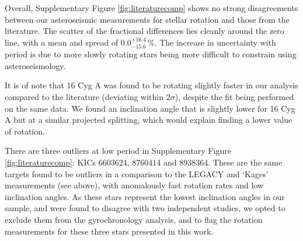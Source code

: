 Overall,  Supplementary Figure \ref{fig:literaturecomp} shows no strong disagreements between our asteroseismic measurements for stellar rotation and those from the literature. The scatter of the fractional differences lies cleanly around the zero line, with a mean and spread of $0.0_{-15.6}^{+16.4}\, \%$. The increase in uncertainty with period is due to more slowly rotating stars being more difficult to constrain using asteroseismology.

It is of note that 16 Cyg A was found to be rotating slightly faster in our analysis compared to the literature \cite{davies+2015} (deviating within $2\sigma$), despite the fit being performed on the same data. We found an inclination angle that is slightly lower for 16 Cyg A but at a similar projected splitting, which would explain finding a lower value of rotation.

There are three outliers at low period in  Supplementary Figure \ref{fig:literaturecomp}: KICs 6603624, 8760414 and 8938364. These are the same targets found to be outliers in a comparison to the LEGACY and `Kages' measurements (see above), with anomalously fast rotation rates and low inclination angles. As these stars represent the lowest inclination angles in our sample, and were found to disagree with two independent studies, we opted to exclude them from the gyrochronology analysis, and to flag the rotation measurements for these three stars presented in this work.


